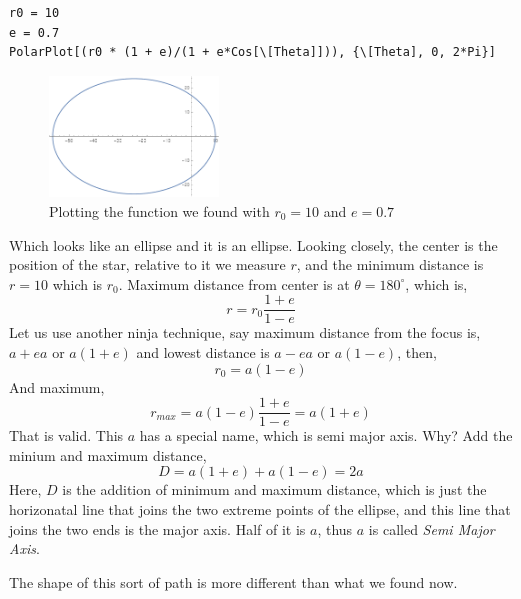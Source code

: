 \documentclass[11pt,a4paper]{article}
\begin{document}
\begin{verbatim}
r0 = 10
e = 0.7 
PolarPlot[(r0 * (1 + e)/(1 + e*Cos[\[Theta]])), {\[Theta], 0, 2*Pi}] 
\end{verbatim}

\begin{figure}[ht!]
    \centering
    \includegraphics[width=0.4\textwidth]{aellipse.pdf}
    \caption{Plotting the function we found with $r_0=10$ and $e = 0.7$}
    \label{fig:}
\end{figure}

Which looks like an ellipse and it is an ellipse. Looking closely, the center is the position of the star, relative to it we measure $r$, and the minimum distance is $r=10$ which is $r_0$. Maximum distance from center is at $\theta = 180^{\circ}$, which is, 
\[ 
r = r_0 \frac{1+ e}{1 - e}
\]
Let us use another ninja technique, say maximum distance from the focus is, $a + ea$ or $a \left( 1 +e \right) $ and lowest distance is $a - ea$ or $a \left( 1 -e \right) $, then, 
\[ 
    r_0 = a \left( 1 -e \right) 
\] 
And maximum,
\[ 
    r_{ max } = a\left( 1 -e \right) \frac{1+e}{1-e} = a\left( 1 + e \right) 
\] That is valid. 
This $a$ has a special name, which is semi major axis. Why? Add  the minium and maximum distance,
\[ 
    D = a(1+e) + a(1-e) = 2a
\]Here, $D$ is the addition of minimum and maximum distance, which is just the horizonatal line that joins the two extreme points of the ellipse, and this line that joins the two ends is the major axis. Half of it is $a$, thus $a$ is called  \emph{Semi Major Axis}.


The shape of this sort of path is more different than what we found now.
\\
\end{document}
